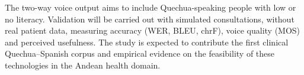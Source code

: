 The
two-way voice output aims to include Quechua-speaking people with low or no literacy. Validation will
be carried out with simulated consultations, without real patient data, measuring accuracy (WER,
BLEU, chrF), voice quality (MOS) and perceived usefulness. The study is expected to contribute the
first clinical Quechua--Spanish corpus and empirical evidence on the feasibility of these
technologies in the Andean health domain.

\vspace{0.3cm}
\noindent{}
\onehalfspacing
